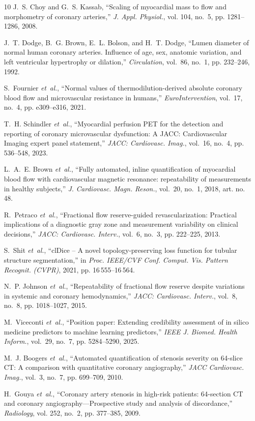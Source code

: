 \documentclass[journal,twoside,web]{ieeecolor}
\begin{document}
\begin{thebibliography}{10}
J.~S. Choy and G.~S. Kassab, ``Scaling of myocardial mass to flow and
  morphometry of coronary arteries,'' \emph{J. Appl. Physiol.}, vol. 104,
  no.~5, pp. 1281--1286, 2008.

J.~T. Dodge, B.~G. Brown, E.~L. Bolson, and H.~T. Dodge, ``Lumen diameter of
  normal human coronary arteries. {Influence} of age, sex, anatomic variation,
  and left ventricular hypertrophy or dilation,'' \emph{Circulation}, vol.~86,
  no.~1, pp. 232--246, 1992.

S.~Fournier \emph{et~al.}, ``Normal values of thermodilution-derived absolute
  coronary blood flow and microvascular resistance in humans,''
  \emph{EuroIntervention}, vol.~17, no.~4, pp. e309--e316, 2021.

T.~H. Schindler \emph{et~al.}, ``Myocardial perfusion {PET} for the detection
  and reporting of coronary microvascular dysfunction: {A} {JACC}:
  {C}ardiovascular {I}maging expert panel statement,'' \emph{JACC: Cardiovasc.
  Imag.}, vol.~16, no.~4, pp. 536--548, 2023.

L.~A.~E. Brown \emph{et~al.}, ``Fully automated, inline quantification of
  myocardial blood flow with cardiovascular magnetic resonance: repeatability
  of measurements in healthy subjects,'' \emph{J. Cardiovasc. Magn. Reson.},
  vol.~20, no.~1, 2018, art. no. 48.

R.~Petraco \emph{et~al.}, ``Fractional flow reserve-guided revascularization:
  {P}ractical implications of a diagnostic gray zone and measurement
  variability on clinical decisions,'' \emph{JACC: Cardiovasc. Interv.},
  vol.~6, no.~3, pp. 222--225, 2013.

S.~Shit \emph{et~al.}, ``cl{D}ice -- {A} novel topology-preserving loss
  function for tubular structure segmentation,'' in \emph{Proc. IEEE/CVF Conf.
  Comput. Vis. Pattern Recognit. (CVPR)}, 2021, pp. 16\,555--16\,564.

N.~P. Johnson \emph{et~al.}, ``Repeatability of fractional flow reserve despite
  variations in systemic and coronary hemodynamics,'' \emph{JACC: Cardiovasc.
  Interv.}, vol.~8, no.~8, pp. 1018--1027, 2015.

M.~Viceconti \emph{et~al.}, ``Position paper: {E}xtending credibility
  assessment of in silico medicine predictors to machine learning predictors,''
  \emph{IEEE J. Biomed. Health Inform.}, vol.~29, no.~7, pp. 5284--5290, 2025.

M.~J. Boogers \emph{et~al.}, ``Automated quantification of stenosis severity on
  64-slice {CT}: {A} comparison with quantitative coronary angiography,''
  \emph{JACC Cardiovasc. Imag.}, vol.~3, no.~7, pp. 699--709, 2010.

H.~Gouya \emph{et~al.}, ``Coronary artery stenosis in high-risk patients:
  64-section {CT} and coronary angiography---{P}rospective study and analysis
  of discordance,'' \emph{Radiology}, vol. 252, no.~2, pp. 377--385, 2009.

\end{thebibliography}
\end{document}
